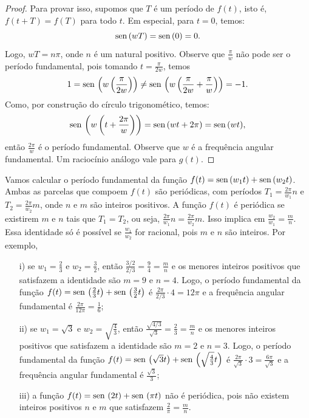 \begin{proof} Para provar isso, supomos que $T$ é um período de $f(t)$, isto é, $f(t+T)=f(T)$ para todo $t$. Em especial, para $t=0$, temos: 
\begin{equation}
\operatorname{sen}\,(wT)=\operatorname{sen}\,(0)=0.
\end{equation}
Logo, $wT=n\pi$, onde $n$ é um natural positivo. Observe que $\frac{\pi}{w}$ não pode ser o período fundamental, pois tomando $t=\frac{\pi}{2w}$, temos
\begin{equation}1=\operatorname{sen}\,\left(w\left(\frac{\pi}{2w}\right)\right)\neq \operatorname{sen}\,\left(w\left(\frac{\pi}{2w}+\frac{\pi}{w}\right)\right)=-1.\end{equation}
Como, por construção do círculo trigonomético, temos:
\begin{equation}
\operatorname{sen}\,\left(w\left(t+\frac{2\pi}{w}\right)\right)=\operatorname{sen}\,(wt+2\pi)=\operatorname{sen}\,(wt),
\end{equation} 
então $\frac{2\pi}{w}$ é o período fundamental. Observe que $w$ é a frequência angular fundamental. Um raciocínio análogo vale para $g(t)$.
\end{proof}
\begin{ex} Vamos calcular o período fundamental da função $f(t)=\operatorname{sen}\,(w_1t)+\operatorname{sen}\,(w_2t)$. Ambas as parcelas que compoem $f(t)$ são periódicas, com períodos $T_1=\frac{2\pi}{w_1}n$ e $T_2=\frac{2\pi}{w_2}m$, onde $n$ e $m$ são inteiros positivos. A função $f(t)$ é periódica se existirem $m$ e $n$ tais que $T_1=T_2$, ou seja, $\frac{2\pi}{w_1}n=\frac{2\pi}{w_2}m$. Isso implica em $\frac{w_2}{w_1}=\frac{m}{n}$. Essa identidade só é possível se $\frac{w_1}{w_2}$ for racional, pois $m$ e $n$ são inteiros. Por exemplo, 
\begin{itemize}
 \item[i)] se $w_1=\frac{2}{3}$ e $w_2=\frac{3}{2}$, então $\frac{3/2}{2/3}=\frac{9}{4}=\frac{m}{n}$ e os menores inteiros positivos que satisfazem a identidade são $m=9$ e $n=4$. Logo, o período fundamental da função $f(t)=\operatorname{sen}\,\left(\frac{2}{3}t\right)+\operatorname{sen}\,\left(\frac{3}{2}t\right)$ é $\frac{2\pi}{2/3}\cdot 4= 12\pi$ e a frequência angular fundamental é $\frac{2\pi}{12\pi}=\frac{1}{6}$; 
 \item[ii)] se $w_1=\sqrt{3}$ e $w_2=\sqrt{\frac{4}{3}}$, então $\frac{\sqrt{4/3}}{\sqrt{3}}=\frac{2}{3}=\frac{m}{n}$ e os menores inteiros positivos que satisfazem a identidade são $m=2$ e $n=3$. Logo, o período fundamental da função $f(t)=\operatorname{sen}\,\left(\sqrt{3}t\right)+\operatorname{sen}\,\left(\sqrt{\frac{4}{3}}t\right)$ é $\frac{2\pi}{\sqrt{3}}\cdot 3= \frac{6\pi}{\sqrt{3}}$ e a frequência angular fundamental é $\frac{\sqrt{3}}{3}$; 
 \item[iii)] a função $f(t)=\operatorname{sen}\,\left(2t\right)+\operatorname{sen}\,\left(\pi t\right)$ não é periódica, pois não existem inteiros positivos $n$ e $m$ que satisfazem $\frac{2}{\pi}=\frac{m}{n}$.
 \end{itemize}
\end{ex}
